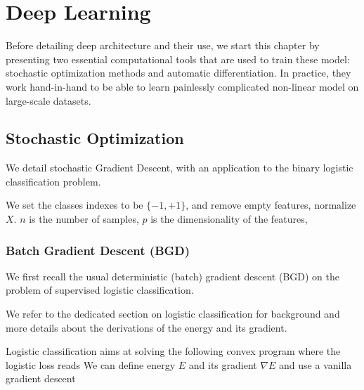 
\chapter{Deep Learning}


Before detailing deep architecture and their use, we start this chapter by presenting two essential computational tools that are used to train these model: stochastic optimization methods and automatic differentiation. In practice, they work hand-in-hand to be able to learn painlessly complicated non-linear model on large-scale datasets. 


\section{Stochastic Optimization}


We detail stochastic Gradient Descent, with an application to the binary logistic classification problem.


We set the classes indexes to be $\{-1,+1\}$, and remove empty features, normalize $X$.
$n$ is the number of samples, $p$ is the dimensionality of the features,


\subsection{Batch Gradient Descent (BGD)}

We first recall the usual deterministic (batch) gradient descent (BGD) on the problem of
supervised logistic classification.

We refer to the dedicated section on logistic classification for
background and more details about the derivations of the energy and its
gradient.

Logistic classification aims at solving the following convex program
where the logistic loss reads
We can define energy $E$ and its gradient $\nabla E$ and use a vanilla gradient descent


